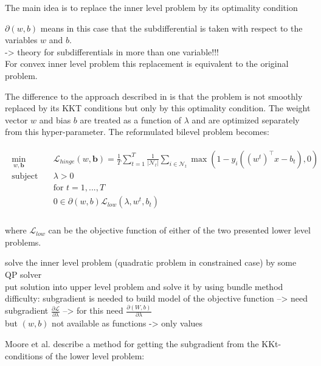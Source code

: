 The main idea is to replace the inner level problem by its optimality condition


\(\partial(w,b)\) means in this case that the subdifferential is taken with respect to the variables \(w\) and \(b\). \\
-> theory for subdifferentials in more than one variable!!! \\

For convex inner level problem this replacement is equivalent to the original problem.

The difference to the approach described in \cite{Kunapuli2008} is that the problem is not smoothly replaced by its KKT conditions but only by this optimality condition. The weight vector \(w\) and bias \(b\) are treated as a function of \(\lambda\) and are optimized separately from this hyper-parameter.
The reformulated bilevel problem becomes:

\begin{align}
	\begin{split}
	\min_{w,\bm{b}} \quad &  \mathcal{L}_{hinge}(w,\bm{b}) = \frac{1}{T}\sum_{t=1}^T\frac{1}{|\mathcal{N}_t|}\sum_{i \in \mathcal{N}_t}{\max\left(1-y_i((w^t)^{\top}x-b_t),0\right)}\\
	\text{subject to} \quad & \lambda > 0 \\
	& \text{for } t = 1,...,T \\
	& 0 \in \partial(w,b)\mathcal{L}_{low}(\lambda,w^t,b_t) \\
\end{split}
\label{SVM_opt_cond}
\end{align}

where \(\mathcal{L}_{low}\) can be the objective function of either of the two presented lower level problems.



solve the inner level problem (quadratic problem in constrained case) by some QP solver \\
put solution into upper level problem and solve it by using bundle method \\
difficulty: subgradient is needed to build model of the objective function --> need subgradient \(\frac{\partial \mathcal{L}}{\partial \lambda}\) --> for this need \(\frac{\partial (W,b)}{\partial \lambda}\) \\
but \((w,b)\) not available as functions -> only values

Moore et al. \cite{Moore2011} describe a method for getting the subgradient from the KKt-conditions of the lower level problem:

